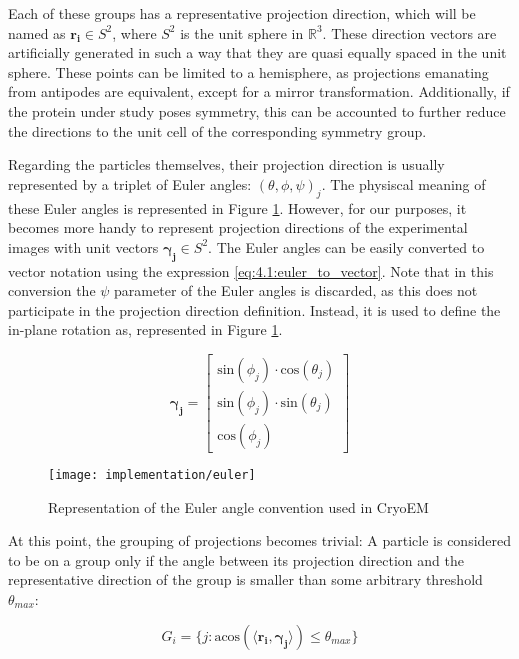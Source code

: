 \documentclass[../main.tex]{subfiles}
\begin{document}
Each of these groups has a representative projection direction, which will be named as $\bm{r_i} \in S^2$, where $S^2$ is the unit sphere in $\mathbb{R}^3$. These direction vectors are artificially generated in such a way that they are quasi equally spaced in the unit sphere. These points can be limited to a hemisphere, as projections emanating from antipodes are equivalent, except for a mirror transformation. Additionally, if the protein under study poses symmetry, this can be accounted to further reduce the directions to the unit cell of the corresponding symmetry group.

Regarding the particles themselves, their projection direction is usually represented by a triplet of Euler angles: $(\theta, \phi, \psi)_j$. The physiscal meaning of these Euler angles is represented in Figure \ref{fig:4.1:euler}. However, for our purposes, it becomes more handy to represent projection directions of the experimental images with unit vectors $\bm{\gamma_j} \in S^2$. The Euler angles can be easily converted to vector notation using the expression \eqref{eq:4.1:euler_to_vector}. Note that in this conversion the $\psi$ parameter of the Euler angles is discarded, as this does not participate in the projection direction definition. Instead, it is used to define the in-plane rotation as, represented in Figure \ref{fig:4.1:euler}.

\begin{equation}\label{eq:4.1:euler_to_vector}
    \bm{\gamma_j} =
    \begin{bmatrix}
        \text{sin}(\phi_j) \cdot \text{cos}(\theta_j) \\ 
        \text{sin}(\phi_j) \cdot \text{sin}(\theta_j) \\ 
        \text{cos}(\phi_j)
    \end{bmatrix}
\end{equation}

\begin{figure}[hbp]
    \centering
    \texttt{[image: implementation/euler]}
    \caption{Representation of the Euler angle convention used in CryoEM}
    \label{fig:4.1:euler}
\end{figure}

At this point, the grouping of projections becomes trivial: A particle is considered to be on a group only if the angle between its projection direction and the representative direction of the group is smaller than some arbitrary threshold $\theta_{max}$:

\begin{equation}
    G_i = \{ j : \text{acos}(\langle \bm{r_i}, \bm{\gamma_j} \rangle) \leq \theta_{max} \}
\end{equation}
\end{document}
